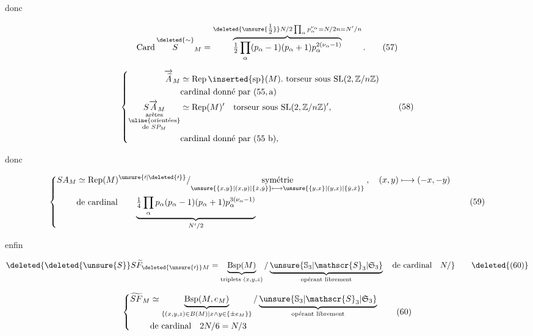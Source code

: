 donc

\[
\operatorname{Card}\overset{\deleted{\sim}}{S}_M=
\overbrace{\tfrac12\prod_\alpha(p_\alpha-1)(p_\alpha+1)p_\alpha^{2(\nu_\alpha-1)}}^{\deleted{\unsure{\tfrac12}}N/2\prod_\alpha p_\alpha^{\nu_\alpha}=N/2n=N'/n}.\tag*{(57)}
\]

\[
\left\{\begin{aligned}
\overrightarrow{\widetilde A}_M&\simeq\operatorname{Rep}\inserted{\mathrm{sp}}(M).\ \text{torseur sous }\mathrm{SL}(2,\mathbb{Z}/n\mathbb{Z})\\
&\text{cardinal donné par }(55,\mathrm{a})\\
\underset{\substack{\text{arêtes}\\\text{\uline{orientées}}\\\text{de }SP_M}}{S\overrightarrow A_M}&\simeq\operatorname{Rep}(M)'\quad\text{torseur sous }\mathrm{SL}(2,\mathbb{Z}/n\mathbb{Z})',\\
&\text{cardinal donné par }(55\ \mathrm{b}),
\end{aligned}\right.\tag*{(58)}
\]

donc

\[
\left\{\begin{aligned}
SA_M&\simeq\operatorname{Rep}(M)^{\unsure{\prime|\deleted{\prime}}}/
\underset{\scriptstyle\unsure{\{x,y\}|\left(x,y\right)|\{\dot{x},\dot{y}\}}\longmapsto\unsure{\{y,x\}|\left(y,x\right)|\{\dot{y},\dot{x}\}}}{\text{symétrie}}\;,\quad(x,y)\longmapsto(-x,-y)\\
&\text{de cardinal}\qquad\underbrace{\tfrac14\prod_\alpha p_\alpha(p_\alpha-1)(p_\alpha+1)p_\alpha^{3(\nu_\alpha-1)}}_{N'/2}
\end{aligned}\right.\tag*{(59)}
\]

enfin

\[
\deleted{\deleted{\unsure{S}}S\widetilde{F}_{\deleted{\unsure{\prime}}M}=\underbrace{\mathrm{Bsp}(M)}_{\text{triplets }(x,y,z)}/\underbrace{\unsure{\mathbb{S}_3|\mathscr{S}_3|\mathfrak{S}_3}}_{\text{opérant librement}}\quad\text{de cardinal}\quad N/}\tag*{\deleted{(60)}}
\]



\[
\left\{\begin{aligned}
\widetilde{SF}_M&\simeq\underbrace{\mathrm{Bsp}(M,e_M)}_{\{(x,y,z)\in B(M)\mid x\wedge y\in\{\pm e_M\}\}}/
\underbrace{\unsure{\mathbb{S}_3|\mathscr{S}_3|\mathfrak{S}_3}}_{\text{opérant librement}}\\
&\text{de cardinal}\quad 2N/6=N/3
\end{aligned}\right.\tag*{(60)}
\]


